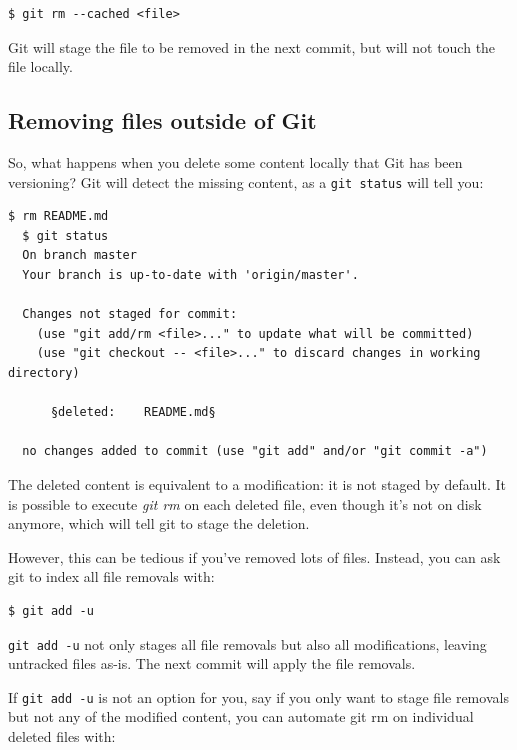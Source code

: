 \documentclass[a4paper]{../../common/tufte-latex/tufte-handout}
\begin{document}
\begin{lstlisting}[style=BashInputStyle]
  $ git rm --cached <file>
\end{lstlisting}

Git will stage the file to be removed in the next commit, but will not touch the file locally.

\subsection{Removing files outside of Git}

So, what happens when you delete some content locally that Git has been versioning?
Git will detect the missing content, as a \texttt{git status} will tell you:

\begin{lstlisting}[style=BashInputStyle]
  $ rm README.md
  $ git status
  On branch master
  Your branch is up-to-date with 'origin/master'.

  Changes not staged for commit:
    (use "git add/rm <file>..." to update what will be committed)
    (use "git checkout -- <file>..." to discard changes in working directory)

      §deleted:    README.md§

  no changes added to commit (use "git add" and/or "git commit -a")
\end{lstlisting}

The deleted content is equivalent to a modification: it is not staged by default.
It is possible to execute \textit{git rm} on each deleted file, even though it's not on disk anymore, which will tell git to stage the deletion.

However, this can be tedious if you've removed lots of files.
Instead, you can ask git to index all file removals with:

\begin{lstlisting}[style=BashInputStyle]
  $ git add -u
\end{lstlisting}

\texttt{git add -u} not only stages all file removals but also all modifications, leaving untracked files as-is.
The next commit will apply the file removals.

If \texttt{git add -u} is not an option for you, say if you only want to stage file removals but not any of the modified content, you can automate git rm on individual deleted files with:
\end{document}

